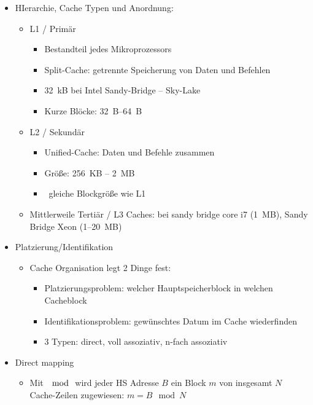 \begin{itemize}
	\item
		HIerarchie, Cache Typen und Anordnung:
		\begin{itemize}
			\item
				L1 / Primär
				\begin{itemize}
					\item
						Bestandteil jedes Mikroprozessors
					\item
						Split-Cache: getrennte Speicherung von Daten und Befehlen
					\item
						\SI{32}{kB} bei Intel Sandy-Bridge -- Sky-Lake
					\item
						Kurze Blöcke: \SIrange{32}{64}{B}
				\end{itemize}
			\item
				L2 / Sekundär
				\begin{itemize}
					\item
						Unified-Cache: Daten und Befehle zusammen
					\item
						Größe: \SI{256}{KB} -- \SI{2}{MB}
					\item
						\idr\ gleiche Blockgröße wie L1
				\end{itemize}
			\item
				Mittlerweile Tertiär / L3 Caches: bei sandy bridge core i7 (\SI{1}{MB}), Sandy Bridge Xeon (1--\SI{20}{MB})

		\end{itemize}
	\item
		Platzierung/Identifikation
		\begin{itemize}
			\item
				Cache Organisation legt 2 Dinge fest:
				\begin{itemize}
					\item
						Platzierungsproblem: welcher Hauptspeicherblock in welchen Cacheblock
					\item
						Identifikationsproblem: gewünschtes Datum im Cache wiederfinden
					\item
						3 Typen: direct, voll assoziativ, n-fach assoziativ
				\end{itemize}
		\end{itemize}
	\item
		Direct mapping
		\begin{itemize}
			\item
				Mit $\mod$ wird jeder HS Adresse $B$ ein Block $m$ von insgesamt $N$ Cache-Zeilen zugewiesen: $m = B \mod N$


\end{itemize}
\end{itemize}
